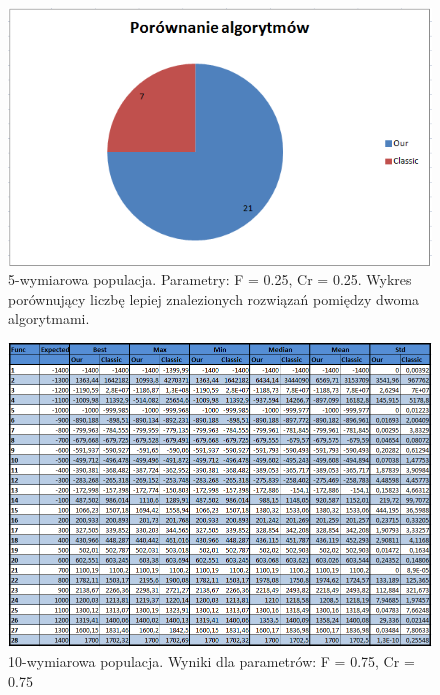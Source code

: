 \documentclass[a4paper]{article}
\begin{document}
\begin{figure}[!h]
\centering
\includegraphics[width=\textwidth]{F75Cr25L10statystyka.png}
\caption{5-wymiarowa populacja. Parametry: F = 0.25, Cr = 0.25. Wykres porównujący liczbę lepiej znalezionych rozwiązań pomiędzy dwoma algorytmami.}
\end{figure}

\begin{figure}[!h]
\centering
\includegraphics[width=\textwidth]{F75Cr75L10tab.png}
\caption{10-wymiarowa populacja. Wyniki dla parametrów: F = 0.75, Cr = 0.75}
\end{figure}
\end{document}
